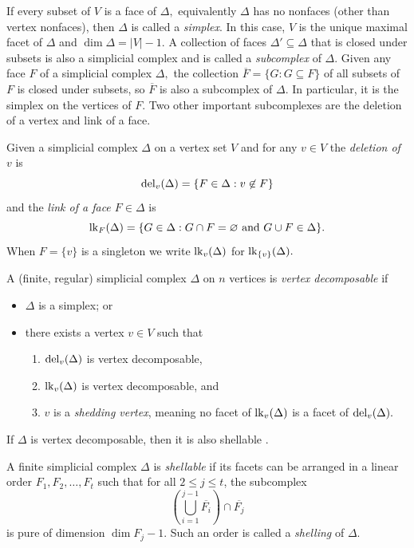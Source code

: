 If every subset of $V$ is a face of $\Delta,$ equivalently $\Delta$ has no nonfaces (other than vertex nonfaces), then $\Delta$ is called a \emph{simplex}. In this case, $V$ is the unique maximal facet of $\Delta$ and $\dim\Delta = |V|-1.$
A collection of faces $\Delta'\subseteq\Delta$ that is closed under subsets is also a simplicial complex and is called a \emph{subcomplex} of $\Delta.$ Given any face $F$ of a simplicial complex $\Delta,$ the collection $\overline{F} = \{G:G\subseteq F\}$ of all subsets of $F$ is closed under subsets, so $\overline{F}$ is also a subcomplex of $\Delta.$ In particular, it is the simplex on the vertices of $F.$ 
Two other important subcomplexes are the deletion of a vertex and link of a face.
\begin{definition}
\label{def: deletion and link of a simplicial complex}
Given a simplicial complex $\Delta$ on a vertex set $V$ and for any $v\in V$ the \emph{deletion of $v$} is 
\[
\mathrm{del}_v(\Delta) = \{F\in\Delta: v\not\in F\}
\]
and the \emph{link of a face $F\in\Delta$} is
\[
\mathrm{lk}_F(\Delta) = \{G\in\Delta : G\cap F = \varnothing \text{ and }G\cup F\in\Delta\}.
\]    
When $F = \{v\}$ is a singleton we write $\mathrm{lk}_v(\Delta)$ for $\mathrm{lk}_{\{v\}}(\Delta).$
\end{definition}
\begin{definition}
\label{def: vertex-decomposable}
    A (finite, regular) simplicial complex $\Delta$ on $n$ vertices is \emph{vertex decomposable} if
    \begin{itemize}
        \item $\Delta$ is a simplex; or
        \item there exists a vertex $v\in V$ such that
        \begin{enumerate}
            \item $\mathrm{del}_v(\Delta)$ is vertex decomposable,
            \item $\mathrm{lk}_v(\Delta)$ is vertex decomposable, and 
            \item $v$ is a \emph{shedding vertex}, meaning no facet of $\mathrm{lk}_v(\Delta)$ is a facet of $\mathrm{del}_v(\Delta).$
        \end{enumerate}
    \end{itemize}
\end{definition}
If $\Delta$ is vertex decomposable, then it is also shellable \cite{bjorner1996shellable}. 
\begin{definition}
\label{def: shellable}
    A finite simplicial complex $\Delta$ is \emph{shellable} if its facets can be arranged in a linear order $F_1,F_2,\ldots,F_t$ such that for all $2\leq j\leq t$, the subcomplex
    \[
    \left(
    \bigcup_{i=1}^{j-1}\overline{F_i}
    \right)
    \cap
    \overline{F_j}
    \]
    is pure of dimension $\dim F_j - 1$. Such an order is called a \emph{shelling} of $\Delta$.
\end{definition}
